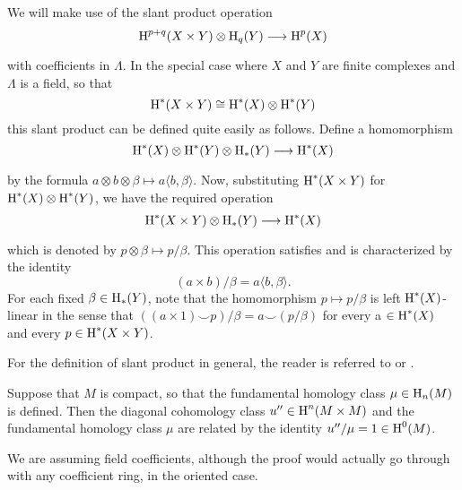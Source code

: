 \documentclass[../main]{subfiles}
\begin{document}
We will make use of the slant product operation
\[
\homology^{p+q}(X \times Y) \otimes \homology_{q}(Y) \varrightarrow{} \homology^{p}(X)
\]
with coefficients in $\Lambda$. In the special case where $X$ and $Y$ are finite complexes and $\Lambda$ is a field, so that
\[\operatorname{H}^{*}(X \times Y) \cong \operatorname{H}^{*}(X) \otimes \operatorname{H}^{*}(Y)\]
this slant product can be defined quite easily as follows. Define a homomorphism
\[
\homology^{*}(X) \otimes \homology^{*}(Y) \otimes \homology_{*}(Y) \varrightarrow{} \homology^{*}(X)
\]
by the formula $a \otimes b \otimes \beta \mapsto a\langle b, \beta\rangle$. Now, substituting \newline $\operatorname{H}^{*}(X \times Y)$ for $\operatorname{H}^{*}(X) \otimes \operatorname{H}^{*}(Y)$, we have the required operation
\[
\homology^{*}(X \times Y) \otimes \homology_{*}(Y) \varrightarrow{} \homology^{*}(X)
\]
which is denoted by $p \otimes \beta \mapsto p / \beta$. This operation satisfies and is characterized by the identity
\[
(a \times b) / \beta=a\langle b, \beta\rangle .
\]
For each fixed $\beta \in \operatorname{H}_{*}(Y)$, note that the homomorphism $p \mapsto p / \beta$ is left $\operatorname{H}^{*}(X)$-linear in the sense that $((a \times 1) \smile p) / \beta=a \smile(p / \beta)$ for every a $\in \operatorname{H}^{*}(X)$ and every $p \in \operatorname{H}^{*}(X \times Y)$.

For the definition of slant product in general, the reader is referred to \cite{spanier1981} or \cite{dold1972}.

\begin{lemma}\label{lem:11.09}
Suppose that $M$ is compact, so that the fundamental homology class $\mu \in \operatorname{H}_{n}(M)$ is defined. Then the diagonal cohomology class $u^{\prime \prime} \in \operatorname{H}^{n}(M \times M)$ and the fundamental homology class $\mu$ are related by the identity \newline $u^{\prime \prime} / \mu=1 \in \operatorname{H}^{0}(M)$.
\end{lemma} 

We are assuming field coefficients, although the proof would actually go through with any coefficient ring, in the oriented case.
\end{document}
